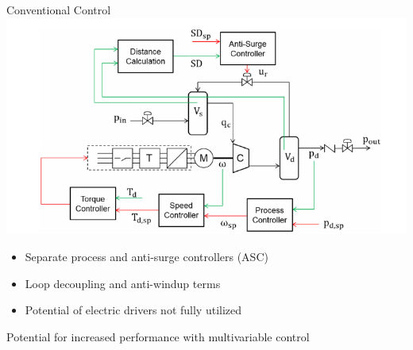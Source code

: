 \begin{frame}{Conventional Control}
  \centering
  \includegraphics[width=0.7\linewidth]{intro/diagram.png}
  \begin{itemize}
    \item Separate process and anti-surge controllers (ASC)
    \item Loop decoupling and anti-windup terms
    \item Potential of electric drivers not fully utilized
  \end{itemize}
  \alert{Potential for increased performance with multivariable control}
\end{frame}

